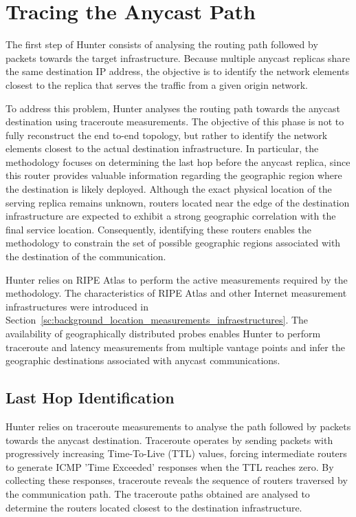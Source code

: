 \documentclass[
A4paper,                %
twoside,                %
openright,              %
chapterprefix=true,     %
12pt,                   %
headings=normal,        %
titlepage=on            %
]{book}
\begin{document}
\section{Tracing the Anycast Path}
\label{sc:hunter_tracing_anycast_path}

The first step of Hunter consists of analysing the routing path followed by packets towards the target infrastructure. Because multiple anycast replicas share the same destination IP address, the objective is to identify the network elements closest to the replica that serves the traffic from a given origin network.

To address this problem, Hunter analyses the routing path towards the anycast destination using traceroute measurements. The objective of this phase is not to fully reconstruct the end to-end topology, but rather to identify the network elements closest to the actual destination infrastructure. In particular, the methodology focuses on determining the last hop before the anycast replica, since this router provides valuable information regarding the geographic region where the destination is likely deployed. Although the exact physical location of the serving replica remains unknown, routers located near the edge of the destination infrastructure are expected to exhibit a strong geographic correlation with the final service location. Consequently, identifying these routers enables the methodology to constrain the set of possible geographic regions associated with the destination of the communication.

Hunter relies on RIPE Atlas to perform the active measurements required by the methodology. The characteristics of RIPE Atlas and other Internet measurement infrastructures were introduced in Section~\ref{sc:background_location_measurements_infraestructures}. The availability of geographically distributed probes enables Hunter to perform traceroute and latency measurements from multiple vantage points and infer the geographic destinations associated with anycast communications.

\subsection{Last Hop Identification}
\label{sc:hunter_tracing_anycast_path_last_hop_identification}

Hunter relies on traceroute measurements to analyse the path followed by packets towards the anycast destination. Traceroute operates by sending packets with progressively increasing Time-To-Live (TTL) values, forcing intermediate routers to generate ICMP 'Time Exceeded' responses when the TTL reaches zero. By collecting these responses, traceroute reveals the sequence of routers traversed by the communication path. The traceroute paths obtained are analysed to determine the routers located closest to the destination infrastructure.
\end{document}

